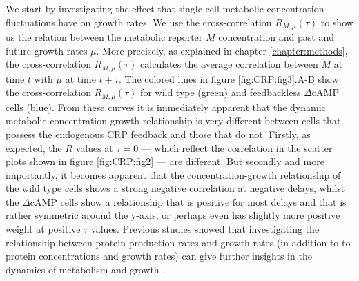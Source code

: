 %
We start by investigating the effect that single cell metabolic concentration fluctuations have on growth rates.
%
We use the 
cross-correlation $R_{M,\mu}(\tau)$ to show us the relation between the metabolic reporter $M$ concentration and past and future growth rates $\mu$.
%
More precisely, as explained in chapter \ref{chapter:methods}, the cross-correlation $R_{M,\mu}(\tau)$ calculates the average correlation between $M$ at time $t$ with $\mu$ at time $t+\tau$.
%
The colored lines in figure \ref{fig:CRP:fig3}.A-B show the cross-correlation $R_{M,\mu}(\tau)$ for wild type (green) and feedbackless $\Delta$cAMP cells (blue).
%
%
From these curves it is immediately apparent that the dynamic metabolic concentration-growth relationship is very different between cells 
that possess the endogenous CRP feedback and those that do not.
%
Firstly, as expected, the $R$ values at $\tau=0$ --- which reflect the correlation in the scatter plots shown in figure \ref{fig:CRP:fig2} --- are different.
But secondly and more importantly, 
%
it becomes apparent that the concentration-growth relationship of the wild type cells shows a strong negative correlation at negative delays, 
whilst the $\Delta$cAMP cells show a relationship that is positive for most delays and that is rather symmetric around the y-axis, or perhaps even has slightly more positive weight at positive $\tau$ values.
%
%
Previous studies showed that investigating the relationship between protein production rates and growth rates (in addition to to protein concentrations and growth rates) can give further insights in the dynamics of metabolism and growth \cite{Kiviet2014}.
